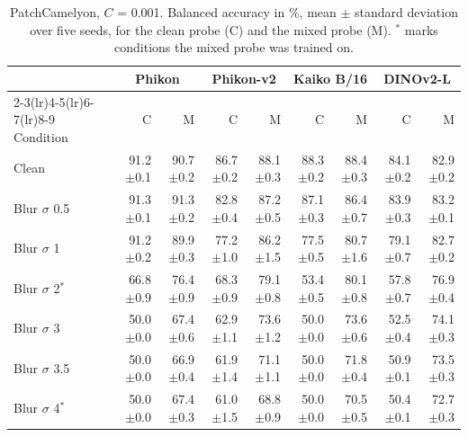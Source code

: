 \begin{table}[H]\centering\small
\caption{PatchCamelyon, $C$ = 0.001. Balanced accuracy in \%, mean $\pm$ standard deviation over five seeds, for the clean probe (C) and the mixed probe (M). $^{*}$ marks conditions the mixed probe was trained on.}
\label{tab:app4}
\setlength{\tabcolsep}{3.5pt}
\begin{tabular}{lrrrrrrrr}
\toprule
 & \multicolumn{2}{c}{Phikon} & \multicolumn{2}{c}{Phikon-v2} & \multicolumn{2}{c}{Kaiko B/16} & \multicolumn{2}{c}{DINOv2-L} \\
\cmidrule(lr){2-3}\cmidrule(lr){4-5}\cmidrule(lr){6-7}\cmidrule(lr){8-9}
Condition & C & M & C & M & C & M & C & M \\
\midrule
Clean & 91.2{\scriptsize$\pm$0.1} & 90.7{\scriptsize$\pm$0.2} & 86.7{\scriptsize$\pm$0.2} & 88.1{\scriptsize$\pm$0.3} & 88.3{\scriptsize$\pm$0.2} & 88.4{\scriptsize$\pm$0.3} & 84.1{\scriptsize$\pm$0.2} & 82.9{\scriptsize$\pm$0.2} \\
\addlinespace
Blur $\sigma$ 0.5 & 91.3{\scriptsize$\pm$0.1} & 91.3{\scriptsize$\pm$0.2} & 82.8{\scriptsize$\pm$0.4} & 87.2{\scriptsize$\pm$0.5} & 87.1{\scriptsize$\pm$0.3} & 86.4{\scriptsize$\pm$0.7} & 83.9{\scriptsize$\pm$0.3} & 83.2{\scriptsize$\pm$0.1} \\
Blur $\sigma$ 1 & 91.2{\scriptsize$\pm$0.2} & 89.9{\scriptsize$\pm$0.3} & 77.2{\scriptsize$\pm$1.0} & 86.2{\scriptsize$\pm$1.5} & 77.5{\scriptsize$\pm$0.5} & 80.7{\scriptsize$\pm$1.6} & 79.1{\scriptsize$\pm$0.7} & 82.7{\scriptsize$\pm$0.2} \\
Blur $\sigma$ 2$^{*}$ & 66.8{\scriptsize$\pm$0.9} & 76.4{\scriptsize$\pm$0.9} & 68.3{\scriptsize$\pm$0.9} & 79.1{\scriptsize$\pm$0.8} & 53.4{\scriptsize$\pm$0.5} & 80.1{\scriptsize$\pm$0.8} & 57.8{\scriptsize$\pm$0.7} & 76.9{\scriptsize$\pm$0.4} \\
Blur $\sigma$ 3 & 50.0{\scriptsize$\pm$0.0} & 67.4{\scriptsize$\pm$0.6} & 62.9{\scriptsize$\pm$1.1} & 73.6{\scriptsize$\pm$1.2} & 50.0{\scriptsize$\pm$0.0} & 73.6{\scriptsize$\pm$0.6} & 52.5{\scriptsize$\pm$0.4} & 74.1{\scriptsize$\pm$0.3} \\
Blur $\sigma$ 3.5 & 50.0{\scriptsize$\pm$0.0} & 66.9{\scriptsize$\pm$0.4} & 61.9{\scriptsize$\pm$1.4} & 71.1{\scriptsize$\pm$1.1} & 50.0{\scriptsize$\pm$0.0} & 71.8{\scriptsize$\pm$0.4} & 50.9{\scriptsize$\pm$0.1} & 73.5{\scriptsize$\pm$0.3} \\
Blur $\sigma$ 4$^{*}$ & 50.0{\scriptsize$\pm$0.0} & 67.4{\scriptsize$\pm$0.3} & 61.0{\scriptsize$\pm$1.5} & 68.8{\scriptsize$\pm$0.9} & 50.0{\scriptsize$\pm$0.0} & 70.5{\scriptsize$\pm$0.5} & 50.4{\scriptsize$\pm$0.1} & 72.7{\scriptsize$\pm$0.3} \\

\end{tabular}
\end{table}
